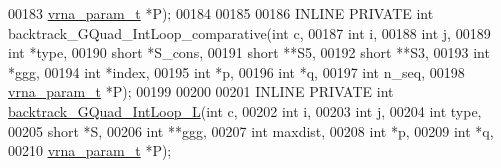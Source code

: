 \begin{DoxyCode}
00183                                            \hyperlink{group__energy__parameters_structvrna__param__s}{vrna\_param\_t} *P);
00184 
00185 
00186 INLINE PRIVATE \textcolor{keywordtype}{int} backtrack\_GQuad\_IntLoop\_comparative(\textcolor{keywordtype}{int}          c,
00187                                                        \textcolor{keywordtype}{int}          i,
00188                                                        \textcolor{keywordtype}{int}          j,
00189                                                        \textcolor{keywordtype}{int}          *type,
00190                                                        \textcolor{keywordtype}{short}        *S\_cons,
00191                                                        \textcolor{keywordtype}{short}        **S5,
00192                                                        \textcolor{keywordtype}{short}        **S3,
00193                                                        \textcolor{keywordtype}{int}          *ggg,
00194                                                        \textcolor{keywordtype}{int}          *index,
00195                                                        \textcolor{keywordtype}{int}          *p,
00196                                                        \textcolor{keywordtype}{int}          *q,
00197                                                        \textcolor{keywordtype}{int}          n\_seq,
00198                                                        \hyperlink{group__energy__parameters_structvrna__param__s}{vrna\_param\_t} *P);
00199 
00200 
00201 INLINE PRIVATE \textcolor{keywordtype}{int} \hyperlink{group__gquads_ga7b371308fa5a45c7ac353ef6ed1014de}{backtrack\_GQuad\_IntLoop\_L}(\textcolor{keywordtype}{int}          c,
00202                                              \textcolor{keywordtype}{int}          i,
00203                                              \textcolor{keywordtype}{int}          j,
00204                                              \textcolor{keywordtype}{int}          type,
00205                                              \textcolor{keywordtype}{short}        *S,
00206                                              \textcolor{keywordtype}{int}          **ggg,
00207                                              \textcolor{keywordtype}{int}          maxdist,
00208                                              \textcolor{keywordtype}{int}          *p,
00209                                              \textcolor{keywordtype}{int}          *q,
00210                                              \hyperlink{group__energy__parameters_structvrna__param__s}{vrna\_param\_t} *P);

\end{DoxyCode}

